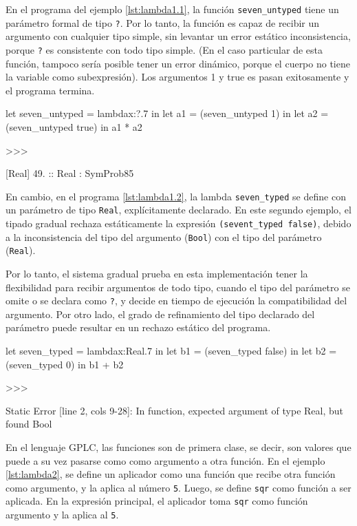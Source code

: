 En el programa del ejemplo \ref{lst:lambda1.1}, la función
\lstinline|seven_untyped| tiene un parámetro formal de tipo \lstinline|?|.
Por lo tanto, la función es capaz de recibir un argumento
con cualquier tipo simple, sin levantar un error estático
inconsistencia, porque \lstinline|?| es consistente con todo tipo
simple. (En el caso particular de esta función, tampoco
sería posible tener un error dinámico, porque el cuerpo
no tiene la variable como subexpresión). Los argumentos
1 y true es pasan exitosamente y el programa termina.

\begin{gplcblock}[caption={Función no tipada},label={lst:lambda1.1}]
let seven_untyped = lambdax:?.7 in
let a1 = (seven_untyped 1) in
let a2 = (seven_untyped true) in
a1 * a2 

>>>

{
	 [Real] 49. :: Real : SymProb85 
}  
\end{gplcblock}

En cambio, en el programa \ref{lst:lambda1.2}, la lambda
\lstinline|seven_typed| se define con un parámetro de tipo
\lstinline|Real|, explícitamente declarado. En este segundo
ejemplo, el tipado gradual rechaza estáticamente
la expresión \lstinline|(sevent_typed false)|, debido a la
inconsistencia del tipo del argumento (\lstinline|Bool|) con
el tipo del parámetro (\lstinline|Real|).

Por lo tanto, el sistema gradual prueba en esta
implementación tener la flexibilidad para recibir
argumentos de todo tipo, cuando el tipo del parámetro
se omite o se declara como \lstinline|?|, y decide en tiempo
de ejecución la compatibilidad del argumento. Por
otro lado, el grado de refinamiento del tipo declarado
del parámetro puede resultar en un rechazo estático del
programa.




\begin{gplcblock}[caption={Función explícitamente tipada},label={lst:lambda1.2}]
let seven_typed = lambdax:Real.7 in
let b1 = (seven_typed false) in
let b2 = (seven_typed 0) in
b1 + b2  

>>>

Static Error [line 2, cols 9-28]: In function, expected argument of type Real, but found Bool
\end{gplcblock}


En el lenguaje GPLC, las funciones son de primera clase,
se decir, son valores que puede a su vez pasarse como
como argumento a otra función. En el ejemplo \ref{lst:lambda2},
se define un aplicador como una función que recibe otra
función como argumento, y la aplica al número \lstinline|5|. Luego,
se define \lstinline|sqr| como función a ser aplicada. En la expresión
principal, el aplicador toma \lstinline|sqr| como función argumento
y la aplica al \lstinline|5|.

